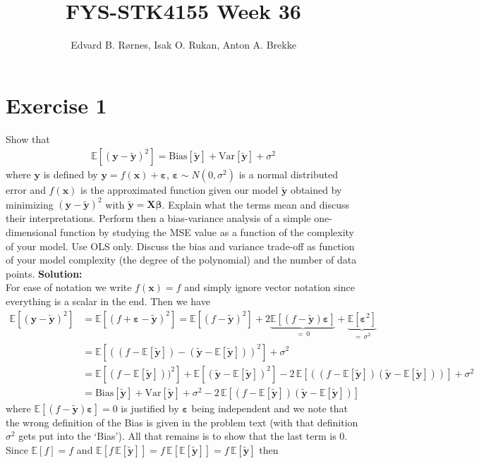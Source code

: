 \documentclass{article}
\title{FYS-STK4155 Week 36}
\author{Edvard B. Rørnes, Isak O. Rukan, Anton A. Brekke}
\begin{document}
	\maketitle
	\section*{Exercise 1}
	Show that
	\begin{align*}
		\mathbb{E}[(\bm y-\tilde{\bm y})^2]=\text{Bias}[\tilde{\bm y}]+\text{Var}[\tilde{\bm y}]+\sigma^2
	\end{align*}
	where $\bm y$ is defined by $\bm y=f(\bm x)+\bm \varepsilon$, $\bm \varepsilon\sim N(0,\sigma^2)$ is a normal distributed error and $f(\bm x)$ is the approximated function given our model $\tilde{\bm y}$ obtained by minimizing $(\bm y-\tilde{\bm y})^2$ with $\tilde{\bm y}=\bm X\bm \beta$. Explain what the terms mean and discuss their interpretations. Perform then a bias-variance analysis of a simple one-dimensional function by studying the MSE value as a function of the complexity of your model. Use OLS only. Discuss the bias and variance trade-off as function of your model complexity (the degree of the polynomial) and the number of data points.
	\textbf{Solution:} \\
	For ease of notation we write $f(\bm x)=f$ and simply ignore vector notation since everything is a scalar in the end. Then we have
	\begin{align*}
		\mathbb{E}[(\bm y-\tilde{\bm y})^2]&=\mathbb{E}[(f+\bm\varepsilon-\tilde{\bm y})^2]=\mathbb{E}[(f-\tilde{\bm y})^2]+2\underbrace{\mathbb{E}[(f-\tilde{\bm y})\bm\varepsilon]}_{=\,0}+\underbrace{\mathbb{E}[\bm\varepsilon^2]}_{=\,\sigma^2}\\
		&=\mathbb{E}[((f-\mathbb{E}[\tilde{\bm y}])-(\tilde{\bm y}-\mathbb{E}[\tilde{\bm y}]))^2]+\sigma^2\\
		&=\mathbb{E}[(f-\mathbb{E}[\tilde{\bm y}]))^2]+\mathbb{E}[(\tilde{\bm y}-\mathbb{E}[\tilde{\bm y}])^2]-2\,\mathbb{E}[((f-\mathbb{E}[\tilde{\bm y}])(\tilde{\bm y}-\mathbb{E}[\tilde{\bm y}]))]+\sigma^2\\
		&=\text{Bias}[\tilde{\bm y}]+\text{Var}[\tilde{\bm y}]+\sigma^2-2\,\mathbb{E}[(f-\mathbb{E}[\tilde{\bm y}])(\tilde{\bm y}-\mathbb{E}[\tilde{\bm y}])]
	\end{align*}
	where $\mathbb{E}[(f-\tilde{\bm y})\bm\varepsilon]=0$ is justified by $\bm\varepsilon$ being independent and we note that the wrong definition of the Bias is given in the problem text (with that definition $\sigma^2$ gets put into the `Bias'). All that remains is to show that the last term is 0. Since $\mathbb{E}[f]=f$ and $\mathbb{E}[f\,\mathbb{E}[\tilde{\bm y}]]=f\,\mathbb{E}[\mathbb{E}[\tilde{\bm y}]]=f\,\mathbb{E}[\tilde{\bm y}]$ then
\end{document}
